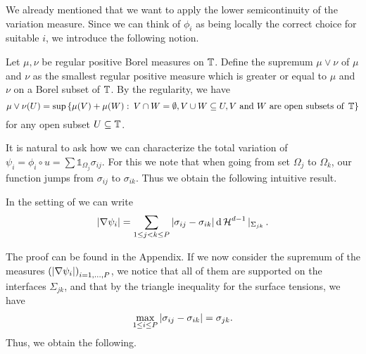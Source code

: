 We already mentioned that we want to apply the lower semicontinuity of the variation measure. Since we can think of $ \phi_{ i } $ as being locally the correct choice for suitable $ i $, we introduce the following notion.

\begin{definition}
	Let $ \mu , \nu $ be regular positive Borel measures on $ \operatorname{\mathbb{T}} $. Define the supremum $ \mu \vee \nu $ of $ \mu $ and $ \nu $ as the smallest regular positive measure which is greater or equal to $ \mu $ and $ \nu $ on a Borel subset of $ \operatorname{\mathbb{T}} $. By the regularity, we have
	\begin{equation*}
		\mu \vee \nu ( U ) 
		=
		\sup \left\{
			\mu ( V ) + \mu ( W )
			\, \colon \,
			V \cap W = \emptyset,
			V \cup W \subseteq U, 
			V \text{ and } W \text{ are open subsets of } \operatorname{\mathbb{T}}
		\right\}
	\end{equation*}
	for any open subset $ U \subseteq \operatorname{\mathbb{T}} $.
\end{definition}

It is natural to ask how we can characterize the total variation of $ \psi_{ i 
} = \phi_{ i } \circ u = \sum \mathds{ 1 }_{ \Omega_{ j } } \sigma_{ i j } $. 
For this we note that when going from set $ \Omega_{ j } $ to $ \Omega_{ k } $, 
our function jumps from $ \sigma_{ i j } $ to $ \sigma_{ i k } $. Thus we 
obtain the following intuitive result.

\begin{lemma}
	\label{rewriting_variation_of_psi_i}
	In the setting of  we can write
	\begin{equation*}
		\abs{ \nabla \psi_{ i } }
		=
		\sum_{ 1 \leq j < k \leq P }
			\abs{ \sigma_{ i j } - \sigma_{ i k } }
			\dd{ \operatorname{\mathcal{H}}^{ d - 1 } |_{ \Sigma_{ j k } } }.
	\end{equation*}
\end{lemma}

The proof can be found in the Appendix. If we now consider the supremum of the 
measures $ \left( \abs{ \nabla \psi_{ i } } \right)_{ i = 1 , \dotsc, P } $, we 
notice that all of them are supported on the interfaces $ \Sigma_{ j k } $, and 
that by the triangle inequality for the surface tensions, we have 
\begin{equation}
	\label{maximum_of_differences_of_surface_tensions}
	\max_{ 1 \leq i \leq P }
		\abs{ \sigma_{ i j } - \sigma_{ i k } }
	=
	\sigma_{ j k }.
\end{equation}
Thus, we obtain the following.

